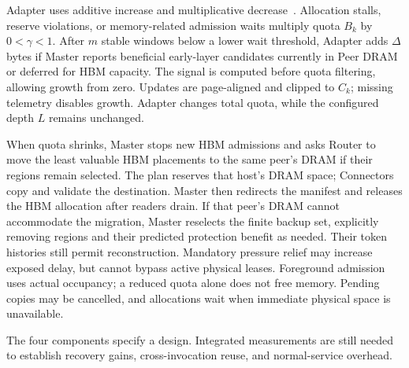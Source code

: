 Adapter uses additive increase and multiplicative
decrease~\cite{chiu1989aimd}. Allocation stalls, reserve violations, or
memory-related admission waits multiply quota $B_k$ by $0<\gamma<1$.
After $m$ stable windows below a lower wait threshold, Adapter adds
$\Delta$ bytes if Master reports beneficial early-layer candidates
currently in Peer DRAM or deferred for HBM capacity. The signal is computed
before quota filtering, allowing growth from zero. Updates are
page-aligned and clipped to $C_k$; missing telemetry disables growth.
Adapter changes total quota, while the configured depth $L$ remains
unchanged.

When quota shrinks, Master stops new HBM admissions and asks Router
to move the least valuable HBM placements to the same peer's DRAM if
their regions remain selected. The plan reserves that host's DRAM
space; Connectors copy and validate the destination. Master then
redirects the manifest and releases the HBM allocation after readers
drain. If that peer's DRAM cannot accommodate the migration, Master
reselects the finite backup set, explicitly removing regions and their
predicted protection benefit as needed.
Their token histories still permit reconstruction. Mandatory pressure
relief may increase exposed delay, but cannot bypass active physical leases.
Foreground admission uses actual occupancy; a reduced quota alone
does not free memory. Pending copies may be cancelled, and allocations
wait when immediate physical space is unavailable.

The four components specify a design. Integrated measurements are
still needed to establish recovery gains, cross-invocation reuse, and
normal-service overhead.
